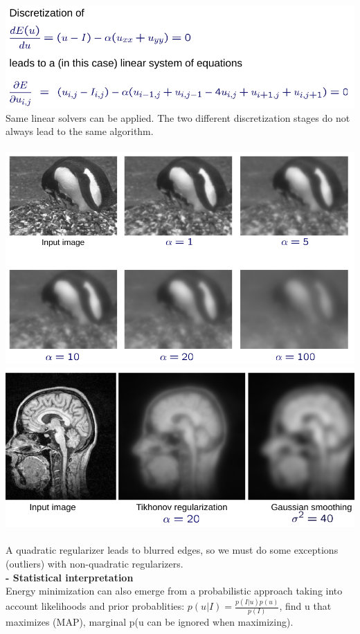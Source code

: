 \documentclass{article}
\begin{document}
\includegraphics[scale=0.3]{43.png}\\
Same linear solvers can be applied. The two different discretization stages do not always lead to the same algorithm.\\\\
\includegraphics[scale=0.3]{44.png}
\includegraphics[scale=0.3]{45.png}\\\\
A quadratic regularizer leads to blurred edges, so we must do some exceptions (outliers) with non-quadratic regularizers. \\
\textbf{- Statistical interpretation}\\
Energy minimization can also emerge from a probabilistic approach taking into account likelihoods and prior probablities: $p(u|I)=\frac{p(I|u)p(u)}{p(I)}$, find u that maximizes (MAP), marginal p(u can be ignored when maximizing).\\
\end{document}
